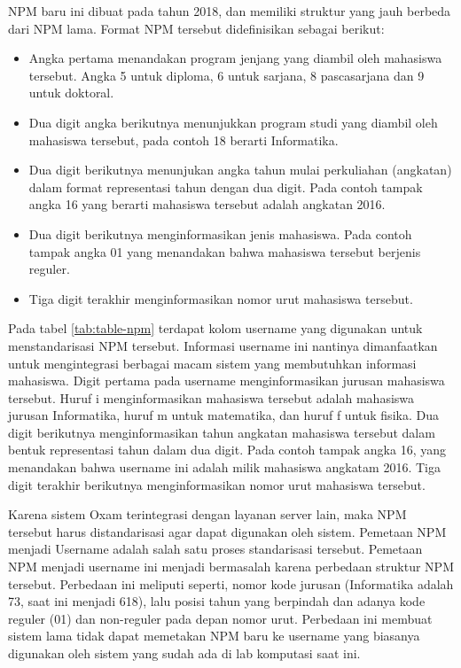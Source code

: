NPM baru ini dibuat pada tahun 2018, dan memiliki struktur yang jauh berbeda dari NPM lama. Format NPM tersebut didefinisikan sebagai berikut:

\begin{itemize}
    \item Angka pertama menandakan program jenjang yang diambil oleh mahasiswa tersebut. Angka 5 untuk diploma, 6 untuk sarjana, 8 pascasarjana dan 9 untuk doktoral. 

    \item Dua digit angka berikutnya menunjukkan program studi yang diambil oleh mahasiswa tersebut, pada contoh 18 berarti Informatika. 
    
    \item Dua digit berikutnya menunjukan angka tahun mulai perkuliahan (angkatan) dalam format representasi tahun dengan dua digit. Pada contoh tampak angka 16 yang berarti mahasiswa tersebut adalah angkatan 2016. 
    
    \item Dua digit berikutnya menginformasikan jenis mahasiswa. Pada contoh tampak angka 01 yang menandakan bahwa mahasiswa tersebut berjenis reguler.
    
    \item Tiga digit terakhir menginformasikan nomor urut mahasiswa tersebut.
\end{itemize}

Pada tabel \ref{tab:table-npm} terdapat kolom username yang digunakan untuk menstandarisasi NPM tersebut. Informasi username ini nantinya dimanfaatkan untuk mengintegrasi berbagai macam sistem yang membutuhkan informasi mahasiswa. Digit pertama pada username menginformasikan jurusan mahasiswa tersebut. Huruf i menginformasikan mahasiswa tersebut adalah mahasiswa jurusan Informatika, huruf m untuk matematika, dan huruf f untuk fisika. Dua digit berikutnya menginformasikan tahun angkatan mahasiswa tersebut dalam bentuk representasi tahun dalam dua digit. Pada contoh tampak angka 16, yang menandakan bahwa username ini adalah milik mahasiswa angkatam 2016. Tiga digit terakhir berikutnya menginformasikan nomor urut mahasiswa tersebut.

Karena sistem Oxam terintegrasi dengan layanan server lain, maka NPM tersebut harus distandarisasi agar dapat digunakan oleh sistem. Pemetaan NPM menjadi Username adalah salah satu proses standarisasi tersebut. Pemetaan NPM menjadi username ini menjadi bermasalah karena perbedaan struktur NPM tersebut. Perbedaan ini meliputi seperti, nomor kode jurusan (Informatika adalah 73, saat ini menjadi 618), lalu posisi tahun yang berpindah dan adanya kode reguler (01) dan non-reguler pada depan nomor urut. Perbedaan ini membuat sistem lama tidak dapat memetakan NPM baru ke username yang biasanya digunakan oleh sistem yang sudah ada di lab komputasi saat ini.

